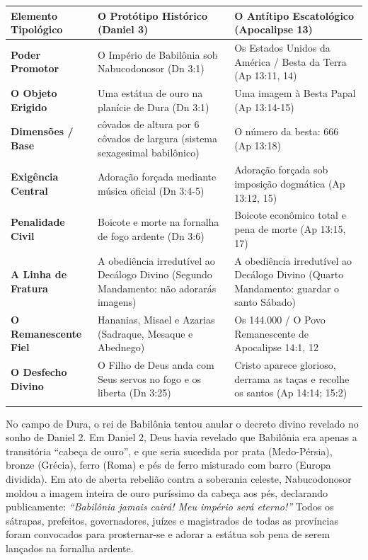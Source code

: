 \begin{table}[htbp]
\centering
\footnotesize
\setlength{\tabcolsep}{5pt}
\renewcommand{\arraystretch}{1.25}
\begin{tabularx}{\textwidth}{>{\raggedright\arraybackslash}p{} >{\raggedright\arraybackslash}X >{\raggedright\arraybackslash}X}
\toprule
\textbf{Elemento Tipológico} & \textbf{O Protótipo Histórico (Daniel 3)} & \textbf{O Antítipo Escatológico (Apocalipse 13)} \\
\midrule
\textbf{Poder Promotor} & O Império de Babilônia sob Nabucodonosor (Dn 3:1) & Os Estados Unidos da América / Besta da Terra (Ap 13:11, 14) \\
\addlinespace[3pt]
\textbf{O Objeto Erigido} & Uma estátua de ouro na planície de Dura (Dn 3:1) & Uma imagem à Besta Papal (Ap 13:14-15) \\
\addlinespace[3pt]
\textbf{Dimensões / Base} & 60 côvados de altura por 6 côvados de largura (sistema sexagesimal babilônico) & O número da besta: 666 (Ap 13:18) \\
\addlinespace[3pt]
\textbf{Exigência Central} & Adoração forçada mediante música oficial (Dn 3:4-5) & Adoração forçada sob imposição dogmática (Ap 13:12, 15) \\
\addlinespace[3pt]
\textbf{Penalidade Civil} & Boicote e morte na fornalha de fogo ardente (Dn 3:6) & Boicote econômico total e pena de morte (Ap 13:15, 17) \\
\addlinespace[3pt]
\textbf{A Linha de Fratura} & A obediência irredutível ao Decálogo Divino (Segundo Mandamento: não adorarás imagens) & A obediência irredutível ao Decálogo Divino (Quarto Mandamento: guardar o santo Sábado) \\
\addlinespace[3pt]
\textbf{O Remanescente Fiel} & Hananias, Misael e Azarias (Sadraque, Mesaque e Abednego) & Os 144.000 / O Povo Remanescente de Apocalipse 14:1, 12 \\
\addlinespace[3pt]
\textbf{O Desfecho Divino} & O Filho de Deus anda com Seus servos no fogo e os liberta (Dn 3:25) & Cristo aparece glorioso, derrama as taças e recolhe os santos (Ap 14:14; 15:2) \\
\addlinespace[3pt]
\bottomrule
\end{tabularx}
\end{table}


No campo de Dura, o rei de Babilônia tentou anular o decreto divino revelado no sonho de Daniel 2. Em Daniel 2, Deus havia revelado que Babilônia era apenas a transitória ``cabeça de ouro'', e que seria sucedida por prata (Medo-Pérsia), bronze (Grécia), ferro (Roma) e pés de ferro misturado com barro (Europa dividida). Em ato de aberta rebelião contra a soberania celeste, Nabucodonosor moldou a imagem inteira de ouro puríssimo da cabeça aos pés, declarando publicamente: \textit{``Babilônia jamais cairá! Meu império será eterno!''} Todos os sátrapas, prefeitos, governadores, juízes e magistrados de todas as províncias foram convocados para prosternar-se e adorar a estátua sob pena de serem lançados na fornalha ardente.

